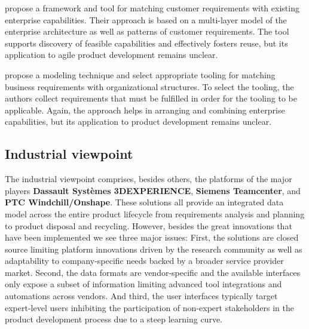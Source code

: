\cite{belfadel2022requirements} propose a framework and tool for matching customer requirements with existing enterprise capabilities.
Their approach is based on a multi-layer model of the enterprise architecture as well as patterns of customer requirements.
The tool supports discovery of feasible capabilities and effectively fosters reuse, but its application to agile product development remains unclear.

\cite{9447081} propose a modeling technique and select appropriate tooling for matching business requirements with organizational structures.
To select the tooling, the authors collect requirements that must be fulfilled in order for the tooling to be applicable.
Again, the approach helps in arranging and combining enterprise capabilities, but its application to product development remains unclear.

\subsection{Industrial viewpoint}
\label{sec:differentiation:commercial}

The industrial viewpoint comprises, besides others, the platforms of the major players \textbf{Dassault Systèmes 3DEXPERIENCE}, \textbf{Siemens Teamcenter}, and \textbf{PTC Windchill/Onshape}.
These solutions all provide an integrated data model across the entire product lifecycle from requirements analysis and planning to product disposal and recycling.
However, besides the great innovations that have been implemented we see three major issues:
First, the solutions are closed source limiting platform innovations driven by the research community as well as adaptability to company-specific needs backed by a broader service provider market.
Second, the data formats are vendor-specific and the available interfaces only expose a subset of information limiting advanced tool integrations and automations across vendors.
And third, the user interfaces typically target expert-level users inhibiting the participation of non-expert stakeholders in the product development process due to a steep learning curve.